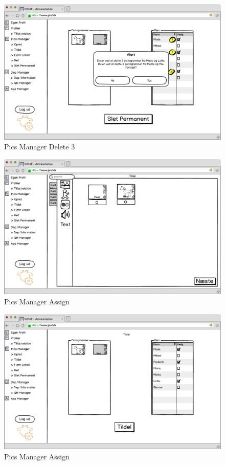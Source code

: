 \newpage

\begin{figure}[!h]
\centering
\includegraphics[width=1\textwidth]{images/mockup/picsManagerSlet3.png}
\caption{Pics Manager Delete 3}
\label{fig:pics_manager_delete3}
\end{figure}

\begin{figure}[!h]
\centering
\includegraphics[width=1\textwidth]{images/mockup/picsManagerTildel.png}
\caption{Pics Manager Assign}
\label{fig:pics_manager_assign}
\end{figure}

\newpage

\begin{figure}[!h]
\centering
\includegraphics[width=1\textwidth]{images/mockup/picsManagerTildel2.png}
\caption{Pics Manager Assign}
\label{fig:pics_manager_assign2}
\end{figure}

